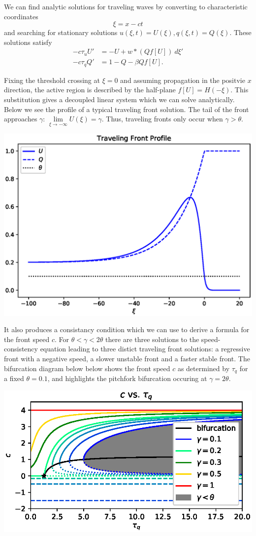 \documentclass[landscape,final]{baposter}
\begin{document}
\begin{poster}
{	We can find analytic solutions for traveling waves by converting to characteristic coordinates
	\[
		\xi = x - ct
	\]
	and searching for stationary solutions $u(\xi, t) = U(\xi), q(\xi, t) = Q(\xi)$. These solutions satisfy
	\begin{align*}
		-c\tau_u U' &= -U + w * (Q f[U]) \ d\xi' \\
		-c \tau_q Q' &= 1 - Q - \beta Q f[U].
	\end{align*}
	\vspace{.2cm}
}
{
	Fixing the threshold crossing at $\xi = 0$ and assuming propagation in the positvie $x$ direction, the active region is described by the half-plane $f[U] = H(-\xi)$. This substitution gives a decoupled linear system which we can solve analytically. Below we see the profile of a typical traveling front solution. The tail of the front approaches $\gamma$: $\lim\limits_{\xi \to -\infty} U(\xi) = \gamma$. Thus, traveling fronts only occur when $\gamma > \theta$.
	\begin{center}
		\includegraphics[width=.45\linewidth]{front_profile}
	\end{center}
	It also produces a consistancy condition which we can use to derive a formula for the front speed $c$. For $\theta < \gamma < 2\theta$ there are three solutions to the speed-consistency equation leading to three distict traveling front solutions: a regressive front with a negative speed, a slower unstable front and a faster stable front. The bifurcation diagram below below shows the front speed $c$ as determined by $\tau_q$ for a fixed $\theta = 0.1$, and highlights the pitchfork bifurcation occuring at $\gamma = 2\theta$.
	\begin{center}
		\includegraphics[width=.45\linewidth]{speed_by_tau_q}
	\end{center}
	
}
\end{poster}
\end{document}
